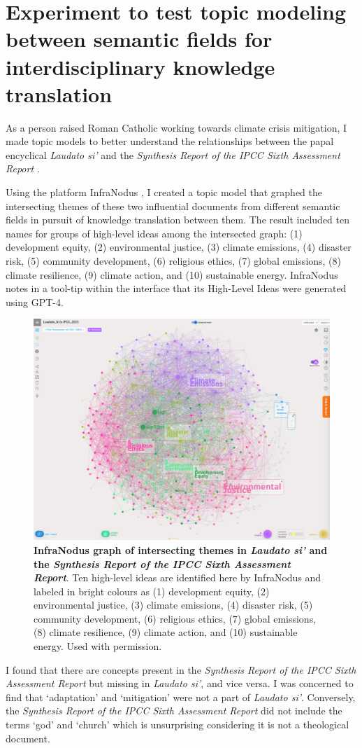 \section{Experiment to test topic modeling between semantic fields for interdisciplinary knowledge translation}
As a person raised Roman Catholic working towards climate crisis mitigation, I made topic models to better understand the relationships between the papal encyclical \textit{Laudato si’} \citep{bergoglio_laudato_2015} and the \textit{Synthesis Report of the IPCC Sixth Assessment Report} \citep{lee_ipcc_2023}. 
 
Using the platform InfraNodus \citep{paranyushkin_infranodus_2019,paranyushkin_infranodus_nodate-2}, I created a topic model that graphed the intersecting themes of these two influential documents from different semantic fields in pursuit of knowledge translation between them. The result included ten names for groups of high-level ideas among the intersected graph:  (1) development equity, (2) environmental justice, (3) climate emissions, (4) disaster risk, (5) community development, (6) religious ethics, (7) global emissions, (8) climate resilience, (9) climate action, and (10) sustainable energy. InfraNodus notes in a tool-tip within the interface that its High-Level Ideas were generated using GPT-4.
\FloatBarrier
\begin{figure}[h]
    \centering
    \includegraphics[width=0.6\linewidth]{figures/4.8.png}
    \caption[InfraNodus graph of intersecting themes in \textit{Laudato si'}]{\textbf{InfraNodus graph of intersecting themes in \textit{Laudato si'} and the \textit{Synthesis Report of the IPCC Sixth Assessment Report}}. Ten high-level ideas are identified here by InfraNodus and labeled in bright colours as (1) development equity, (2) environmental justice, (3) climate emissions, (4) disaster risk, (5) community development, (6) religious ethics, (7) global emissions, (8) climate resilience, (9) climate action, and (10) sustainable energy. Used with permission.}
    \label{fig:4.8}
\end{figure}
\FloatBarrier
\par
I found that there are concepts present in the \textit{Synthesis Report of the IPCC Sixth Assessment Report} but missing in \textit{Laudato si'}, and vice versa. I was concerned to find that ‘adaptation’ and ‘mitigation’ were not a part of \textit{Laudato si’}. Conversely, the \textit{Synthesis Report of the IPCC Sixth Assessment Report} did not include the terms `god’ and `church’ which is unsurprising considering it is not a theological document.

